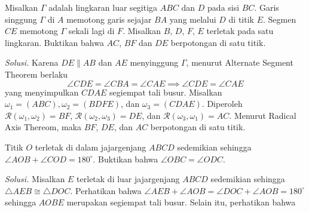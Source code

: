 \documentclass[a4paper, 11pt]{article}
\begin{document}
\newpage
\begin{tcolorbox}[title=\textbf{Soal 3: APMO 2020/1}]
Misalkan $\Gamma$ adalah lingkaran luar segitiga $ABC$ dan $D$ pada sisi $BC$. Garis singgung $\Gamma$ di $A$ memotong garis sejajar $BA$ yang melalui $D$ di titik $E$. Segmen $CE$ memotong $\Gamma$ sekali lagi di $F$. Misalkan $B$, $D$, $F$, $E$ terletak pada satu lingkaran. Buktikan bahwa $AC$, $BF$ dan $DE$ berpotongan di satu titik.
\end{tcolorbox}
\noindent\textit{Solusi.} Karena $DE\parallel AB$ dan $AE$ menyinggung $\Gamma$, menurut Alternate Segment Theorem berlaku
\[\angle CDE = \angle CBA =\angle CAE\implies \angle CDE=\angle CAE\]
yang menyimpulkan $CDAE$ segiempat tali busur. Misalkan $\omega_1=(ABC),\omega_2=(BDFE)$, dan $\omega_3=(CDAE)$. Diperoleh $\mathcal{R}(\omega_1,\omega_2) = BF$, $\mathcal{R}(\omega_2,\omega_3) =DE$, dan $\mathcal{R}(\omega_3,\omega_1)=AC$. Menurut Radical Axis Thereom, maka $BF$, $DE$, dan $AC$ berpotongan di satu titik.
\begin{center}
\end{center}
\newpage
\begin{tcolorbox}[title=\textbf{Soal 4: Canada 1997/4}]
Titik $O$ terletak di dalam jajargenjang $ABCD$ sedemikian sehingga $\angle AOB+\angle COD=180^\circ$. Buktikan bahwa $\angle OBC=\angle ODC$.
\end{tcolorbox}
\noindent\textit{Solusi.} Misalkan $E$ terletak di luar jajargenjang $ABCD$ sedemikian sehingga $\triangle AEB\cong \triangle DOC$. Perhatikan bahwa 
$\angle AEB+\angle AOB = \angle DOC + \angle AOB=180^\circ$ sehingga $AOBE$ merupakan segiempat tali busur. Selain itu, perhatikan bahwa
\end{document}
